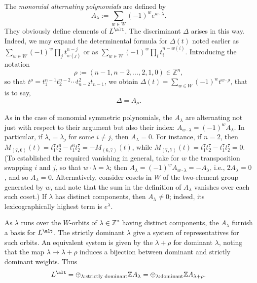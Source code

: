 \documentclass[reqno]{amsart} 
\begin{document}
The \emph{monomial alternating polynomials} are defined by
\begin{equation*}
  A_{\lambda} := \sum_{w \in W} (-1)^w e^{w \cdot \lambda}.
\end{equation*}
They obviously define elements of $L^{\alt}$.  The discriminant $\Delta$ arises in this way.  Indeed, we may expand the determinental formula for $\Delta(t)$ noted earlier as $\sum_{w \in W} (-1)^w \prod_j t_{w(j)}^{n-j}$ or as $\sum_{w \in W} (-1)^w \prod_i t_{i}^{n-w(i)}$.  Introducing the notation
\begin{equation*}
  \rho := (n-1,n-2,\dotsc,2,1,0) \in \mathbb{Z}^n,
\end{equation*}
so that $t^\rho = t_1^{n-1} t_2^{n-2} \dotsb t_{n-2}^2 t_{n-1}$, we obtain $\Delta(t) = \sum_{w \in W} (-1)^w t^{w \cdot \rho}$, that is to say,
\begin{equation*}
  \Delta = A_{\rho}.
\end{equation*}

As in the case of monomial symmetric polynomials, the $A_\lambda$ are alternating not just with respect to their argument but also their index: $A_{w \cdot \lambda} = (-1)^w A_\lambda$.  In particular, if $\lambda_i = \lambda_j$ for some $i \neq j$, then $A_{\lambda} = 0$.  For instance, if $n = 2$, then $M_{(7,6)}(t) = t_1^7 t_2^6 - t_1^6 t_2^7 = - M_{(6,7)}(t)$, while $M_{(7,7)}(t) = t_1^7 t_2^7 - t_1^7 t_2^7 = 0$.  (To established the required vanishing in general, take for $w$ the transposition swapping $i$ and $j$, so that $w \cdot \lambda = \lambda$; then $A_\lambda = (-1)^w A_{w \cdot \lambda} = - A_\lambda$, i.e., $2 A_\lambda = 0$, and so $A_\lambda = 0$.  Alternatively, consider cosets in $W$ of the two-element group generated by $w$, and note that the sum in the definition of $A_{\lambda}$ vanishes over each such coset.)  If $\lambda$ has distinct components, then $A_\lambda \neq 0$; indeed, its lexicographically highest term is $e^{\lambda}$.

As $\lambda$ runs over the $W$-orbits of $\lambda \in \mathbb{Z}^n$ having distinct components, the $A_\lambda$ furnish a basis for $L^{\alt}$.  The strictly dominant $\lambda$ give a system of representatives for such orbits.  An equivalent system is given by the $\lambda + \rho$ for dominant $\lambda$, noting that the map $\lambda \mapsto \lambda + \rho$ induces a bijection between dominant and strictly dominant weights.  Thus
\begin{equation*}
  L^{\alt}
  = \oplus_{\lambda:\text{strictly dominant}}
  \mathbb{Z} A_\lambda
  = \oplus_{\lambda:\text{dominant}}
  \mathbb{Z} A_{\lambda + \rho}.
\end{equation*}
\end{document}
